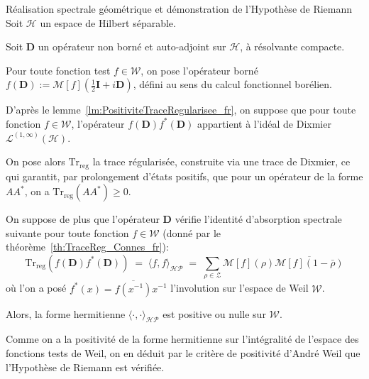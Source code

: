 \documentclass[Riemann_Hypothesis.tex]{subfiles}
\begin{document}
\begin{theorem}[label=th:ResolutionConjectureHP_fr]{Réalisation spectrale géométrique et démonstration de l'Hypothèse de Riemann}
    Soit $\mathcal{H}$ un espace de Hilbert séparable. \par
    Soit $\mathbf{D}$ un opérateur non borné et auto-adjoint sur $\mathcal{H}$, à résolvante compacte. \par
    Pour toute fonction test $f \in \mathcal{W}$, on pose l'opérateur borné $f(\mathbf{D}) := \mathcal{M}[f]\left(\frac{1}{2}\mathbf{I} + i\mathbf{D}\right)$, défini au sens du calcul fonctionnel borélien. \par
    D'après le lemme~\ref{lm:PositiviteTraceRegularisee_fr}, 
    on suppose que pour toute fonction $f \in \mathcal{W}$, 
    l'opérateur $f(\mathbf{D}) f^*(\mathbf{D})$ appartient à l'idéal de 
    Dixmier $\mathcal{L}^{(1, \infty)}(\mathcal{H})$. \par
    On pose alors $\mathrm{Tr}_{\mathrm{reg}}$ la trace régularisée, 
    construite via une trace de Dixmier, ce qui garantit, par prolongement 
    d'états positifs, que pour un opérateur de la forme $A A^*$, on a 
    $\mathrm{Tr}_{\mathrm{reg}}(A A^*) \geq 0$. \par
    On suppose de plus que l'opérateur $\mathbf{D}$ vérifie 
    l'identité d'absorption spectrale suivante pour toute fonction 
    $f \in \mathcal{W}$ (donné par le théorème~\ref{th:TraceReg_Connes_fr}):
    \begin{equation*}
        \mathrm{Tr}_{\mathrm{reg}}\left( f(\mathbf{D}) f^*(\mathbf{D}) \right) \;=\; \langle f, f \rangle_{\mathcal{HP}} \;=\; \sum_{\rho \in \mathcal{Z}} \mathcal{M}[f](\rho) \overline{\mathcal{M}[f](1-\bar{\rho})}
    \end{equation*}
    où l'on a posé $f^*(x) = \overline{f(x^{-1})} x^{-1}$ l'involution sur l'espace de Weil $\mathcal{W}$. \par
    Alors, la forme hermitienne $\langle \cdot, \cdot \rangle_{\mathcal{HP}}$ est positive ou nulle sur $\mathcal{W}$. \par
    Comme on a la positivité de la forme hermitienne sur l'intégralité de l'espace des fonctions tests de Weil, on en déduit par le critère de positivité d'André Weil que l'Hypothèse de Riemann est vérifiée.
\end{theorem}
\end{document}
